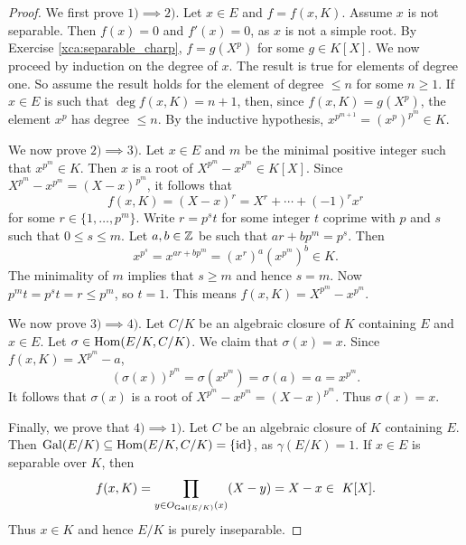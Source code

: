 \begin{proof}
    We first prove $1)\implies 2)$. 
    Let $x\in E$ and $f=f(x,K)$. Assume $x$ is not separable. Then
    $f(x)=0$ and $f'(x)=0$, as $x$ is not a simple root. By Exercise \ref{xca:separable_charp}, 
    $f=g(X^p)$ for some $g\in K[X]$. 
    We now proceed by induction on the degree of $x$. The result
    is true for elements of degree one. So assume the result holds for the element of degree $\leq n$ 
    for some $n\geq1$. 
    If $x\in E$ is such that $\deg f(x,K)=n+1$, then, since $f(x,K)=g(X^p)$, the element 
    $x^p$ has degree $\leq n$. By the inductive hypothesis, $x^{p^{m+1}}=(x^p)^{p^m}\in K$.  

    We now prove $2)\implies 3)$. Let $x\in E$ and $m$ be the minimal positive integer 
    such that $x^{p^m}\in K$. Then
    $x$ is a root of $X^{p^m}-x^{p^m}\in K[X]$. Since 
    $X^{p^m}-x^{p^m}=(X-x)^{p^m}$, it follows that 
    \[
    f(x,K)=(X-x)^r=X^r+\cdots+(-1)^rx^r
    \]
    for some
    $r\in\{1,\dots,p^m\}$. Write $r=p^st$ for some integer $t$ coprime with $p$ and $s$ such that
    $0\leq s\leq m$. Let $a,b\in\mathbb{Z}$ be such that $ar+bp^m=p^s$. Then 
    \[
    x^{p^s}=x^{ar+bp^m}=\left(x^r\right)^a\left(x^{p^m}\right)^b\in K.
    \]
    The minimality of $m$ implies that $s\geq m$ and hence $s=m$. Now $p^mt=p^st=r\leq p^m$, so $t=1$. 
    This means $f(x,K)=X^{p^m}-x^{p^m}$. 
    
    We now prove $3)\implies 4)$. Let $C/K$ be an algebraic closure of $K$ containing $E$ and $x\in E$.  
    Let $\sigma\in\operatorname{Hom}(E/K,C/K)$. We claim that $\sigma(x)=x$. Since 
    $f(x,K)=X^{p^m}-a$, 
    \[
    \left(\sigma(x)\right)^{p^m}=\sigma\left(x^{p^m}\right)=\sigma(a)=a=x^{p^m}.
    \]
    It follows that $\sigma(x)$ is a root of $X^{p^m}-x^{p^m}=(X-x)^{p^m}$. 
    Thus $\sigma(x)=x$. 
    
    Finally, we prove that $4)\implies1)$. Let 
    $C$ be an algebraic closure of $K$ containing $E$. 
    Then $\operatorname{Gal}(E/K)\subseteq\operatorname{Hom}(E/K,C/K)=\{\operatorname{id}\}$, as $\gamma(E/K)=1$. 
    If $x\in E$ is separable over $K$, then
    \[
    f(x,K)=\prod_{y\in O_{\operatorname{Gal}(E/K)}(x)}(X-y)=X-x\in\ K[X].
    \]
    Thus $x\in K$ and hence $E/K$ is purely inseparable. 
\end{proof}

